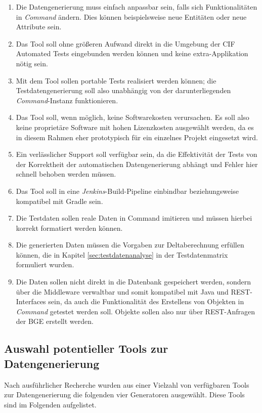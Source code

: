 \begin{enumerate}
    \item Die Datengenerierung muss einfach anpassbar sein, falls sich Funktionalitäten in \textit{Command} ändern. Dies können beispielsweise neue Entitäten oder neue Attribute sein.
    \item Das Tool soll ohne größeren Aufwand direkt in die Umgebung der \ac{CIF} Automated Tests eingebunden werden können und keine extra-Applikation nötig sein.
    \item Mit dem Tool sollen portable Tests realisiert werden können; die Testdatengenerierung soll also unabhängig von der darunterliegenden \textit{Command}-Instanz funktionieren.
    \item Das Tool soll, wenn möglich, keine Softwarekosten verursachen. Es soll also keine proprietäre Software mit hohen Lizenzkosten ausgewählt werden, da es in diesem Rahmen eher prototypisch für ein einzelnes Projekt eingesetzt wird.
    \item Ein verlässlicher Support soll verfügbar sein, da die Effektivität der Tests von der Korrektheit der automatischen Datengenerierung abhängt und Fehler hier schnell behoben werden müssen.
    \item Das Tool soll in eine \textit{Jenkins}-Build-Pipeline einbindbar beziehungsweise kompatibel mit Gradle sein.
    \item Die Testdaten sollen reale Daten in Command imitieren und müssen hierbei korrekt formatiert werden können.
    \item Die generierten Daten müssen die Vorgaben zur Deltaberechnung erfüllen können, die in Kapitel \ref{sec:testdatenanalyse} in der Testdatenmatrix formuliert wurden.
    \item Die Daten sollen nicht direkt in die Datenbank gespeichert werden, sondern über die Middleware verwaltbar und somit kompatibel mit Java und \ac{REST}-Interfaces sein, da auch die Funktionalität des Erstellens von Objekten in \textit{Command} getestet werden soll. Objekte sollen also nur über \ac{REST}-Anfragen der \ac{BGE} erstellt werden.
\end{enumerate}

\subsection{Auswahl potentieller Tools zur Datengenerierung}\label{toolanalysauswahl}
Nach ausführlicher Recherche wurden aus einer Vielzahl von verfügbaren Tools zur Datengenerierung die folgenden vier Generatoren ausgewählt. Diese Tools sind im Folgenden aufgelistet.

